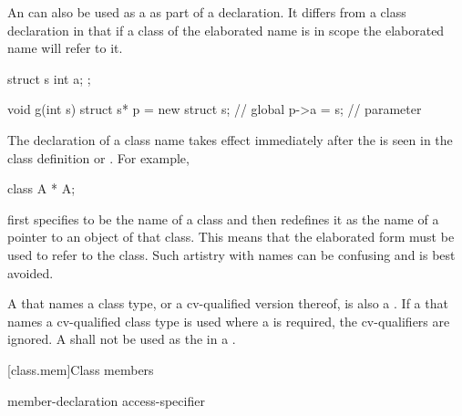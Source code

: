 \pnum
{}%
%
\begin{note}
An  can also
be used as a  as part of a declaration. It
differs from a class declaration in that if a class of the elaborated
name is in scope the elaborated name will refer to it.
\end{note}
\begin{example}

\begin{codeblock}
struct s { int a; };

void g(int s) {
  struct s* p = new struct s;   // global 
  p->a = s;                     // parameter 
}
\end{codeblock}
\end{example}

\pnum
{}%
\begin{note}
The declaration of a class name takes effect immediately after the
 is seen in the class definition or
. For example,

\begin{codeblock}
class A * A;
\end{codeblock}

first specifies  to be the name of a class and then redefines
it as the name of a pointer to an object of that class. This means that
the elaborated form   must be used to refer to the
class. Such artistry with names can be confusing and is best avoided.
\end{note}

\pnum
{}%
A  that names a class type,
or a cv-qualified version thereof, is also a . If a
 that names a cv-qualified class type is used
where a  is required, the cv-qualifiers are
ignored. A  shall not be used as the
 in a .

[class.mem]{Class members}%
%

\begin{bnf}
\br
    member-declaration \br
    access-specifier \terminal{:} 
\end{bnf}

